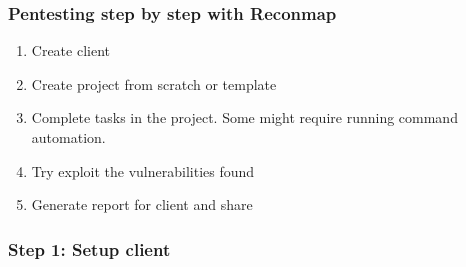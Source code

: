 \documentclass{beamer}
\begin{document}
\begin{frame}
	\frametitle{Pentesting step by step with Reconmap}
	
	\begin{enumerate}
		\item Create client
		\item Create project from scratch or template
		\item Complete tasks in the project. Some might require running command automation.
		\item Try exploit the vulnerabilities found
		\item Generate report for client and share
	\end{enumerate}
\end{frame}

\begin{frame}
	\frametitle{Step 1: Setup client}
\end{frame}
\end{document}
